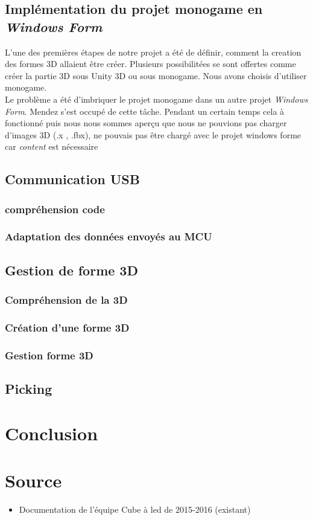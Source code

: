\documentclass[a4paper,12pt]{article}
\begin{document}
\subsection{Implémentation du projet monogame en \textit{Windows Form}}

L'une des premières étapes de notre projet a été de définir, comment la creation des formes 3D allaient être créer. Plusieurs possibilitées se sont offertes comme créer la partie 3D sous Unity 3D ou sous monogame. Nous avons choisis d'utiliser monogame. \\

Le problème a été d'imbriquer le projet monogame dans un autre projet \textit{Windows Form}. Mendez s'est occupé de cette tâche. Pendant un certain temps cela à fonctionné puis nous nous sommes aperçu que nous ne pouvions pas charger d'images 3D (.x , .fbx), ne pouvais pas être chargé avec le projet windows forme car \textit{content} est nécessaire

\subsection{Communication USB}
\subsubsection{compréhension code}
\subsubsection{Adaptation des données envoyés au MCU}
\subsection{Gestion de forme 3D}

\subsubsection{Compréhension de la 3D}
\subsubsection{Création d'une forme 3D}
\subsubsection{Gestion forme 3D}
\subsection{Picking}

\section{Conclusion}

\newpage

\section{Source}
\begin{itemize}
	\item Documentation de l'équipe Cube à led de 2015-2016 (existant)
\end{itemize}

\newpage
\listoffigures
\end{document}
